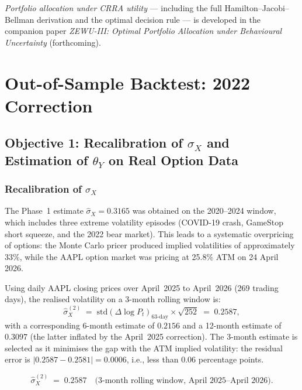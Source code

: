 \documentclass[12pt,a4paper]{article}
\theoremstyle{definition}
\theoremstyle{remark}
\begin{document}
\noindent\textit{Portfolio allocation under CRRA utility} --- including
the full Hamilton--Jacobi--Bellman derivation and the optimal decision
rule --- is developed in the companion paper \emph{ZEWU-III: Optimal
Portfolio Allocation under Behavioural Uncertainty} (forthcoming).

\section{Out-of-Sample Backtest: 2022 Correction}
\label{sec:backtest}

\subsection{Objective 1: Recalibration of $\sigma_X$ and
            Estimation of $\theta_Y$ on Real Option Data}

\subsubsection{Recalibration of $\sigma_X$}

The Phase~1 estimate $\hat{\sigma}_X = 0.3165$ was obtained on the
2020--2024 window, which includes three extreme volatility episodes
(COVID-19 crash, GameStop short squeeze, and the 2022 bear market).
This leads to a systematic overpricing of options: the Monte Carlo
pricer produced implied volatilities of approximately 33\%, while the
AAPL option market was pricing at 25.8\% ATM on 24 April 2026.

Using daily AAPL closing prices over April~2025 to April~2026
(269 trading days), the realised volatility on a 3-month rolling
window is:
\begin{equation}
  \hat{\sigma}_X^{(2)} \;=\;
  \mathrm{std}\!\left(\Delta\log P_t\right)_{63\text{-day}} \times \sqrt{252}
  \;=\; 0.2587,
\end{equation}
with a corresponding 6-month estimate of $0.2156$ and a 12-month
estimate of $0.3097$ (the latter inflated by the April~2025 correction).
The 3-month estimate is selected as it minimises the gap with the
ATM implied volatility: the residual error is $|0.2587 - 0.2581|
= 0.0006$, i.e., less than 0.06 percentage points.

\begin{zewubox}
\[
  \hat{\sigma}_X^{(2)} \;=\; 0.2587 \quad
  \text{(3-month rolling window, April 2025--April 2026).}
\]
\end{zewubox}
\end{document}
